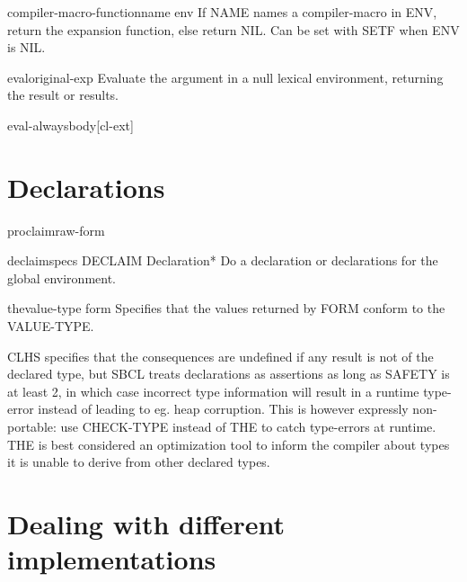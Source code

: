 \documentclass[10pt,english]{book}
\begin{document}
\begin{accessor}{compiler-macro-function}{name \op env}
  If NAME names a compiler-macro in ENV, return the expansion function, else
return NIL. Can be set with SETF when ENV is NIL.
\end{accessor}

\begin{function}{eval}{original-exp}
  Evaluate the argument in a null lexical environment, returning the
   result or results.
\end{function}

\begin{macro}{eval-always}{\body body}[cl-ext]
  
\end{macro}



\chapter{Declarations}
\label{cha:declarations}

\begin{function}{proclaim}{raw-form}
  
\end{function}

\begin{macro}{declaim}{\rest specs}
  DECLAIM Declaration*
  Do a declaration or declarations for the global environment.
\end{macro}

\begin{specialop}{the}{value-type form}
  Specifies that the values returned by FORM conform to the VALUE-TYPE.

CLHS specifies that the consequences are undefined if any result is
not of the declared type, but SBCL treats declarations as assertions
as long as SAFETY is at least 2, in which case incorrect type
information will result in a runtime type-error instead of leading to
eg. heap corruption. This is however expressly non-portable: use
CHECK-TYPE instead of THE to catch type-errors at runtime. THE is best
considered an optimization tool to inform the compiler about types it
is unable to derive from other declared types.
\end{specialop}

\chapter{Dealing with different implementations}
\label{cha:deal-with-diff}
\end{document}
